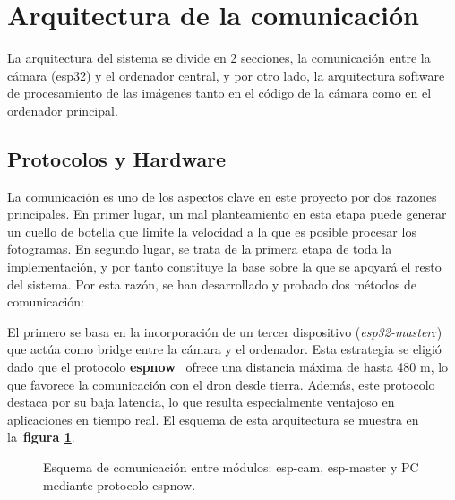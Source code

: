     \section{Arquitectura de la comunicación}
La arquitectura del sistema se divide en 2 secciones, la comunicación entre la cámara (esp32) y el ordenador central, y por otro lado, la arquitectura software de procesamiento de las imágenes tanto en el código de la cámara como en el ordenador principal.

      \subsection{Protocolos y Hardware}
La comunicación es uno de los aspectos clave en este proyecto por dos razones principales. En primer lugar, un mal planteamiento en esta etapa puede generar un cuello de botella que limite la velocidad a la que es posible procesar los fotogramas. En segundo lugar, se trata de la primera etapa de toda la implementación, y por tanto constituye la base sobre la que se apoyará el resto del sistema. Por esta razón, se han desarrollado y probado dos métodos de comunicación:

El primero se basa en la incorporación de un tercer dispositivo (\textit{esp32-master}r) que actúa como bridge entre la cámara y el ordenador. Esta estrategia se eligió dado que el protocolo \textbf{espnow}~\cite{espnow_repo} ofrece una distancia máxima de hasta 480 m, lo que favorece la comunicación con el dron desde tierra. Además, este protocolo destaca por su baja latencia, lo que resulta especialmente ventajoso en aplicaciones en tiempo real. El esquema de esta arquitectura se muestra en la~\textbf{figura \ref{fig:comms_esquema_espnow}}.

\vspace{1cm}
\begin{figure}[H] %
    \centering
    \caption{Esquema de comunicación entre módulos: esp-cam, esp-master y PC mediante protocolo espnow.}
    \label{fig:comms_esquema_espnow}
\end{figure}


